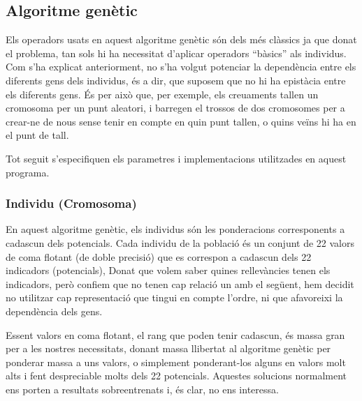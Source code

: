 \documentclass[titlepage,a4paper,12pt]{book}
\begin{document}

\subsection{Algoritme genètic} %
\label{sub:Algoritme genetic}

Els operadors usats en aquest algoritme genètic són dels més clàssics ja que
donat el problema, tan sols hi ha necessitat d'aplicar operadors ``bàsics'' als
individus.  Com s'ha explicat anteriorment, no s'ha volgut potenciar la
dependència entre els diferents gens dels individus, és a dir, que suposem que
no hi ha epistàcia entre els diferents gens.  És per això que, per exemple, els
creuaments tallen un cromosoma per un punt aleatori, i barregen el trossos de
dos cromosomes per a crear-ne de nous sense tenir en compte en quin punt tallen,
o quins veïns hi ha en el punt de tall.

Tot seguit s'especifiquen els parametres i implementacions utilitzades en aquest
programa.

\subsubsection{Individu (Cromosoma)}
\label{ssub:individu (cromosoma)}

En aquest algoritme genètic, els individus són les ponderacions corresponents a
cadascun dels potencials.  Cada individu de la població és un conjunt de 22 valors de
coma flotant (de doble precisió) que es correspon a cadascun dels 22 indicadors
(potencials),  Donat que volem saber quines rellevàncies tenen els indicadors, però
confiem que no tenen cap relació un amb el següent, hem decidit no utilitzar cap
representació que tingui en compte l'ordre, ni que afavoreixi la dependència
dels gens. %

Essent valors en coma flotant, el rang que poden tenir cadascun, és massa gran
per a les nostres necessitats, donant massa llibertat al algoritme genètic per
ponderar massa a uns valors, o simplement ponderant-los alguns en valors molt alts
i fent despreciable molts dels 22 potencials.  Aquestes solucions normalment ens
porten a resultats sobreentrenats i, és clar, no ens interessa.
\end{document}
